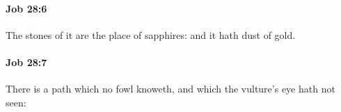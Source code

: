 		\paragraph{Job 28:6} %
			\label{JOB-28-6}

			The stones of it are the place of sapphires: and it hath dust of gold.


		\paragraph{Job 28:7} %
			\label{JOB-28-7}

			There is a path which no fowl knoweth, and which the vulture’s eye hath not seen:



